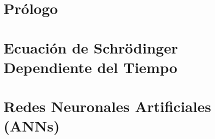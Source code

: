 \documentclass[openany,%
                headinclude,footinclude,abstract=on,
                BCOR=5mm,paper=a4,fontsize=12pt
                ]{scrreprt}
\begin{document}
\frenchspacing
\raggedbottom

\pagestyle{plain}

\nocite{*} %



%


\cleardoublepage
\cleardoublepage

\cleardoublepage

\pagestyle{scrheadings}
\part{Prólogo}\label{pt:Prologo}




\cleardoublepage
\part{Ecuación de Schrödinger Dependiente del Tiempo}\label{pt:TDSE}





\part{Redes Neuronales Artificiales (ANNs)}\label{pt:ANNS}



\end{document}
